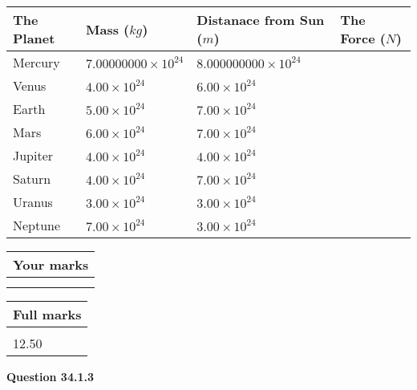 \documentclass[12pt]{article}
\begin{document}
\vspace{0.2in}
 
 
\begin{tabular}{|l|l|l|l|}
\hline
The Planet & Mass ($kg$) & Distanace from Sun ($m$) & The Force ($N$)\\
\hline
Mercury  &
           $ %
7.00000000 \times 10^{24} $   &
             $ %
8.000000000 \times 10^{24} $    &
\\  \hline
Venus    &
           $ %
4.00 \times 10^{24} $    &
             $ %
6.00 \times 10^{24} $    &
\\  \hline
Earth    &
           $ %
5.00 \times 10^{24} $    &
             $ %
7.00 \times 10^{24} $    &
\\   \hline
Mars     &
           $ %
6.00 \times 10^{24} $    &
             $ %
7.00 \times 10^{24} $    &
\\   \hline
Jupiter  &
           $ %
4.00 \times 10^{24} $    &
             $ %
4.00 \times 10^{24} $    &
\\  \hline
Saturn   &
           $ %
4.00 \times 10^{24}$    &
             $ %
7.00 \times 10^{24}$    &
\\  \hline
Uranus   &
           $ %
3.00 \times 10^{24} $    &
             $ %
3.00 \times 10^{24} $    &
\\  \hline
Neptune  &
           $ %
7.00 \times 10^{24} $    &
             $ %
3.00 \times 10^{24} $    &
\\  \hline
 
\end{tabular}
 
 

 
 

 
\vspace{0.3in}
  
\vspace{0.2in}
  
         \begin{tabular}{|l|}
\hline
 Your marks  \\
\hline
 \\ 
 \\ 
\hline
\end{tabular}
\hspace{0.05in} \begin{tabular}{|l|}
\hline
 Full marks  \\
\hline
 \\ 
12.50 \\
\hline
\end{tabular}
{\textbf{\Large{Question
34.1.3 
}}}
  
\end{document}

